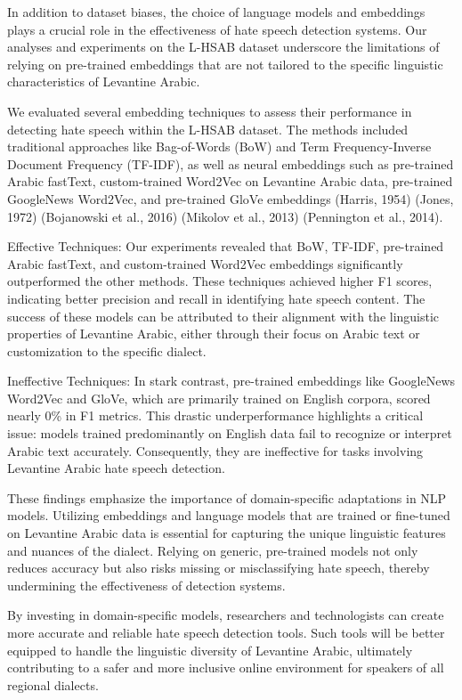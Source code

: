 \documentclass[11pt]{article}
\begin{document}
In addition to dataset biases, the choice of language models and embeddings plays a crucial role in the effectiveness of hate speech detection systems. Our analyses and experiments on the L-HSAB dataset underscore the limitations of relying on pre-trained embeddings that are not tailored to the specific linguistic characteristics of Levantine Arabic.

We evaluated several embedding techniques to assess their performance in detecting hate speech within the L-HSAB dataset. The methods included traditional approaches like Bag-of-Words (BoW) and Term Frequency-Inverse Document Frequency (TF-IDF), as well as neural embeddings such as pre-trained Arabic fastText, custom-trained Word2Vec on Levantine Arabic data, pre-trained GoogleNews Word2Vec, and pre-trained GloVe embeddings (Harris, 1954) (Jones, 1972) (Bojanowski et al., 2016) (Mikolov et al., 2013) (Pennington et al., 2014).

Effective Techniques: Our experiments revealed that BoW, TF-IDF, pre-trained Arabic fastText, and custom-trained Word2Vec embeddings significantly outperformed the other methods. These techniques achieved higher F1 scores, indicating better precision and recall in identifying hate speech content. The success of these models can be attributed to their alignment with the linguistic properties of Levantine Arabic, either through their focus on Arabic text or customization to the specific dialect.

Ineffective Techniques: In stark contrast, pre-trained embeddings like GoogleNews Word2Vec and GloVe, which are primarily trained on English corpora, scored nearly 0\% in F1 metrics. This drastic underperformance highlights a critical issue: models trained predominantly on English data fail to recognize or interpret Arabic text accurately. Consequently, they are ineffective for tasks involving Levantine Arabic hate speech detection.

These findings emphasize the importance of domain-specific adaptations in NLP models. Utilizing embeddings and language models that are trained or fine-tuned on Levantine Arabic data is essential for capturing the unique linguistic features and nuances of the dialect. Relying on generic, pre-trained models not only reduces accuracy but also risks missing or misclassifying hate speech, thereby undermining the effectiveness of detection systems.

By investing in domain-specific models, researchers and technologists can create more accurate and reliable hate speech detection tools. Such tools will be better equipped to handle the linguistic diversity of Levantine Arabic, ultimately contributing to a safer and more inclusive online environment for speakers of all regional dialects.
\end{document}
